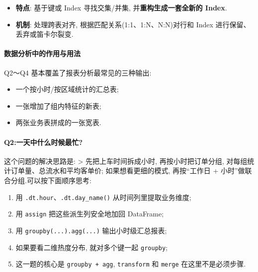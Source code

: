 \documentclass[11pt]{article}
\providecommand{\tightlist}{%
      \setlength{\itemsep}{0pt}\setlength{\parskip}{0pt}}
\begin{document}
\begin{itemize}
\tightlist
\item
  \textbf{特点}: 基于键或 Index 寻找交集/并集,
  并\textbf{重构生成一套全新的 Index}.
\item
  \textbf{机制}: 处理跨表对齐, 根据匹配关系(1:1、1:N、N:N)对行和 Index
  进行保留、丢弃或笛卡尔裂变.
\end{itemize}

    \paragraph{数据分析中的作用与用法}\label{ux6570ux636eux5206ux6790ux4e2dux7684ux4f5cux7528ux4e0eux7528ux6cd5}

    Q2～Q4 基本覆盖了报表分析最常见的三种输出:

\begin{itemize}
\tightlist
\item
  一个按小时/按区域统计的汇总表;
\item
  一张增加了组内特征的新表;
\item
  两张业务表拼成的一张宽表.
\end{itemize}

    \paragraph{Q2:一天中什么时候最忙?}\label{q2ux4e00ux5929ux4e2dux4ec0ux4e48ux65f6ux5019ux6700ux5fd9}

    这个问题的解决思路是: \textgreater{} 先把上车时间拆成小时,
再按小时把订单分组, 对每组统计订单量、总流水和平均客单价;
如果想看更细的模式, 再按``工作日 + 小时''做联合分组.可以按下面顺序思考:

\begin{enumerate}
\def\labelenumi{\arabic{enumi}.}
\tightlist
\item
  用 \texttt{.dt.hour}、\texttt{.dt.day\_name()} 从时间列里提取业务维度;
\item
  用 \texttt{assign} 把这些派生列安全地加回 DataFrame;
\item
  用 \texttt{groupby(...).agg(...)} 输出小时级汇总报表;
\item
  如果要看二维热度分布, 就对多个键一起 \texttt{groupby};
\item
  这一题的核心是 \texttt{groupby\ +\ agg}, \texttt{transform} 和
  \texttt{merge} 在这里不是必须步骤.
\end{enumerate}
\end{document}
